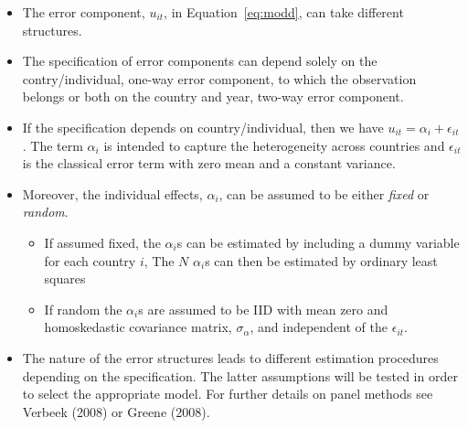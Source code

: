 \documentclass[landscape,letterpaper,9pt]{article}
\newcommand\cbox[1]{\colorbox{darkyellow}{#1}}
\begin{document}
\begin{itemize}
%
\item The \cbox{error component}, \(u_{it}\), in Equation~\ref{eq:modd}, can take different structures.
\item  The specification of
error components can depend solely on the contry/individual, \cbox{one-way} error component,  to which the observation
belongs or both on the country and year, \cbox{two-way} error component. 
\item If the specification depends on
country/individual, then we have \(u_{it} =  \alpha_i + \epsilon_{it}\).
The term \(\alpha_i\) is intended to capture the heterogeneity across
countries and \(\epsilon_{it}\) is the classical error term with
zero mean and a constant variance. 
\item Moreover, the individual effects, \(\alpha_i\),
can be assumed to be either \emph{fixed} or \emph{random}. 
\begin{itemize}
\item
If assumed \cbox{fixed}, the
\(\alpha_i\)s can be estimated by including a dummy variable for each country $i$,%
The $N$ \(\alpha_i\)s can then be estimated by ordinary least squares 
\item  If  \cbox{random} the \(\alpha_i\)s  are assumed to be  IID with mean zero
and homoskedastic covariance matrix, \(\sigma_\alpha\), and  independent of the \(\epsilon_{it}\). 
\end{itemize}
\item 
The nature of the error structures
leads to different estimation procedures depending on the specification.
The latter assumptions will be tested in order to select the appropriate model.
For further details  on panel methods see
Verbeek (2008) or  Greene (2008).

\end{itemize}
\end{document}
